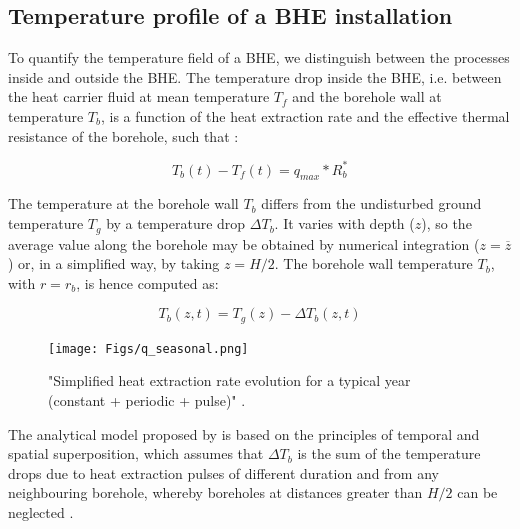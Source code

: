 \subsection{Temperature profile of a BHE installation}
\label{model_intro}

To quantify the temperature field of a BHE, we distinguish between the processes inside and outside the BHE. The temperature drop inside the BHE, i.e. between the heat carrier fluid at mean temperature $T_f$ and the borehole wall at temperature $T_b$, is a function of the heat extraction rate and the effective thermal resistance of the borehole, such that \citep{claesson_conductive_1988}:

\begin{equation}
\label{eq:T_b}
    T_b(t) - T_f(t) = q_\mathit{max}*R_b^*
\end{equation}


The temperature at the borehole wall $T_b$ differs from the undisturbed ground temperature $T_g$ by a temperature drop $\Delta T_b$. It varies with depth ($z$), so the average value along the borehole may be obtained by numerical integration ($z = \overline{z}$) or, in a simplified way, by taking $z = H/2$. The borehole wall temperature $T_b$, with $r = r_b$, is hence computed as:

\begin{equation}
    T_b(z, t) = T_g(z) - \Delta T_b(z, t)
\end{equation}

\begin{figure}
    \centering
    \texttt{[image: Figs/q\_seasonal.png]}
    \caption{"Simplified heat extraction rate evolution for a typical year (constant + periodic + pulse)" \citep{pahud_geothermal_2002}.}
    \label{fig:q_seasonal}
\end{figure}

The analytical model proposed by \citet{eskilson_thermal_1987} is based on the principles of temporal and spatial superposition, which assumes that $\Delta T_b$ is the sum of the temperature drops due to heat extraction pulses of different duration and from any neighbouring borehole, whereby boreholes at distances greater than $H/2$ can be neglected \cite{pahud_geothermal_2002}.

